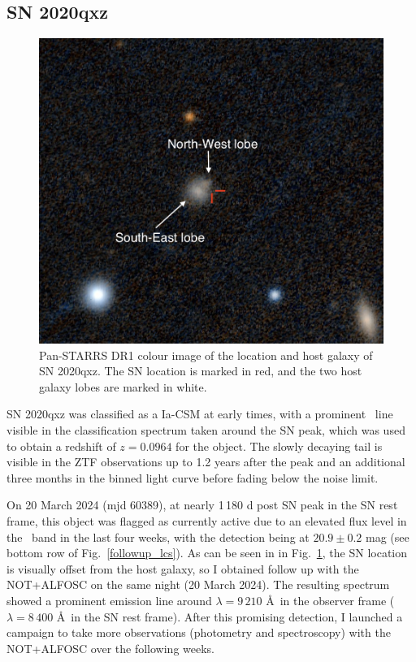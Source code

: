 \documentclass[a4paper,oneside,12pt, class=Latex/Classes/PhDthesisPSnPDF, crop=false]{standalone}
\begin{document}
\subsection{SN 2020qxz}
\label{sec:SN2020qxz}
\begin{figure}
    \centering
    \includegraphics[width=\textwidth]{../Images/chapter_5/2020qxz_loc.png}
    \caption{Pan-STARRS DR1 colour image of the location and host galaxy of SN 2020qxz. The SN location is marked in red, and the two host galaxy lobes are marked in white.}
    \label{2020qxz_loc}
\end{figure}

SN 2020qxz was classified as a Ia-CSM at early times, with a prominent \Halpha\ line visible in the classification spectrum taken around the SN peak, which was used to obtain a redshift of $z=0.0964$ for the object. The slowly decaying tail is visible in the ZTF observations up to 1.2 years after the peak and an additional three months in the binned light curve before fading below the noise limit.

On 20 March 2024 (mjd 60389), at nearly 1\,180 d post SN peak in the SN rest frame, this object was flagged as currently active due to an elevated flux level in the \ztfi\ band in the last four weeks, with the detection being at $20.9\pm 0.2$ mag (see bottom row of Fig.~\ref{followup_lcs}). As can be seen in in Fig.~\ref{2020qxz_loc}, the SN location is visually offset from the host galaxy, so I obtained follow up with the NOT+ALFOSC on the same night (20 March 2024). The resulting spectrum showed a prominent emission line around $\lambda=9\,210$ \AA\ in the observer frame ($\lambda=8\,400$ \AA\ in the SN rest frame). After this promising detection, I launched a campaign to take more observations (photometry and spectroscopy) with the NOT+ALFOSC over the following weeks.
\end{document}
